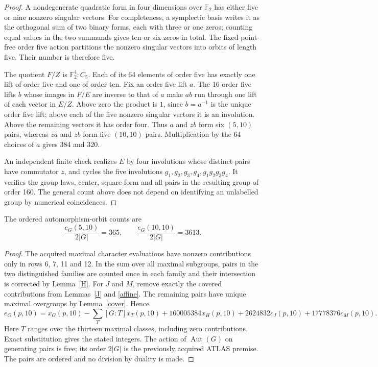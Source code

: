 \documentclass[11pt,a4paper]{article}
\begin{document}
\begin{proof}
A nondegenerate quadratic form in four dimensions over
$\mathbb F_2$ has either five or nine nonzero singular vectors.
For completeness, a symplectic basis writes it as the orthogonal
sum of two binary forms, each with three or one zeros; counting
equal values in the two summands gives ten or six zeros in total.
The fixed-point-free order five action partitions the nonzero
singular vectors into orbits of length five. Their number is
therefore five.

The quotient $F/Z$ is $\mathbb F_2^4:C_5$. Each of its 64 elements
of order five has exactly one lift of order five and one of order
ten. Fix an order five lift $a$. The 16 order five lifts $b$ whose
images in $F/E$ are inverse to that of $a$ make $ab$ run through
one lift of each vector in $E/Z$. Above zero the product is $1$,
since $b=a^{-1}$ is the unique order five lift; above each of the
five nonzero singular vectors it is an involution. Above the
remaining vectors it has order four. Thus $a$ and $zb$ form six
$(5,10)$ pairs, whereas $za$ and $zb$ form five $(10,10)$ pairs.
Multiplication by the 64 choices of $a$ gives 384 and 320.

An independent finite check realizes $E$ by four involutions
whose distinct pairs have commutator $z$, and cycles the five
involutions $g_1,g_2,g_3,g_4,g_1g_2g_3g_4$. It verifies the group
laws, center, square form and all pairs in the resulting group
of order 160. The general count above does not depend on identifying
an unlabelled group by numerical coincidences.
\end{proof}

\begin{theorem}
The ordered automorphism-orbit counts are
\[
 \frac{e_G(5,10)}{2|G|}=365,\qquad
 \frac{e_G(10,10)}{2|G|}=3613.
\]
\end{theorem}
\begin{proof}
The acquired maximal character evaluations have nonzero
contributions only in rows 6, 7, 11 and 12. In the sum over all
maximal subgroups, pairs in the two distinguished families are
counted once in each family and their intersection is corrected
by Lemma~\ref{H}. For $J$ and $M$, remove exactly the covered
contributions from Lemmas~\ref{J} and \ref{affine}. The remaining
pairs have unique maximal overgroups by Lemma~\ref{cover}. Hence
\[
 e_G(p,10)=x_G(p,10)-\sum_T[G:T]x_T(p,10)
 +160005384x_H(p,10)+2624832c_J(p,10)+17778376c_M(p,10).
\]
Here $T$ ranges over the thirteen maximal classes, including zero
contributions. Exact substitution gives the stated integers.
The action of $\operatorname{Aut}(G)$ on generating pairs is free;
its order $2|G|$ is the previously acquired ATLAS premise. The
pairs are ordered and no division by duality is made.
\end{proof}
\end{document}
